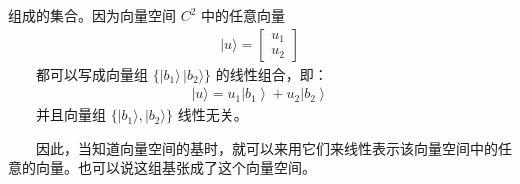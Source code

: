 \documentclass[a4paper,11pt,english]{sphinxmanual}
\begin{document}
\sphinxAtStartPar
​组成的集合。因为向量空间  \(C^{2}\) 中的任意向量
\begin{equation*}
\begin{split}|u\rangle=\left[\begin{array}{l}u_{1} \\u_{2}\end{array}\right]\end{split}
\end{equation*}
\sphinxAtStartPar
​  都可以写成向量组  \(\{|b_{1}\rangle\,|b_{2}\rangle\}\) 的线性组合，即：
\begin{equation*}
\begin{split}|u\rangle=u_{1}\left|b_{1}\right\rangle+u_{2}\left|b_{2}\right\rangle\end{split}
\end{equation*}
\sphinxAtStartPar
​  并且向量组  \(\{|b_{1}\rangle,|b_{2}\rangle\}\) 线性无关。

\sphinxAtStartPar
​​  因此，当知道向量空间的基时，就可以来用它们来线性表示该向量空间中的任意的向量。也可以说这组基张成了这个向量空间。
\end{document}
